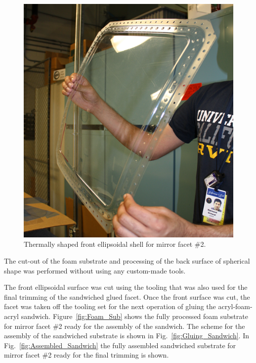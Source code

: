 \begin{figure}[ht]
    \centering
    \includegraphics[width=0.90\linewidth]{images/Front_Shell.png}
    \caption{Thermally shaped front ellipsoidal shell for mirror facet \#2.}
    \label{fig:Shell}
\end{figure}

The cut-out of the foam substrate and processing of the back surface of spherical shape was performed without
using any custom-made tools.%

The front ellipsoidal surface was cut using the tooling that was also used for the final trimming of the sandwiched
glued facet. Once the front surface was cut, the facet was taken off the tooling set for the next operation of
gluing the acryl-foam-acryl sandwich. Figure~\ref{fig:Foam_Sub} shows the fully processed foam substrate for
mirror facet \#2 ready for the assembly of the sandwich. The scheme for the assembly of the sandwiched substrate
is shown in Fig.~\ref{fig:Gluing_Sandwich}. In Fig.~\ref{fig:Assembled_Sandwich} the fully assembled sandwiched
substrate for mirror facet \#2 ready for the final trimming is shown. 

